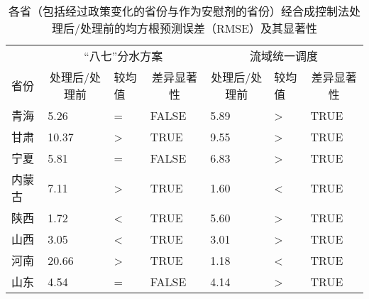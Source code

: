 
\begin{table}[!htbp]\footnotesize
	\centering
	\caption[合成控制法的安慰剂检验结果]{各省（包括经过政策变化的省份与作为安慰剂的省份）经合成控制法处理后/处理前的均方根预测误差（RMSE）及其显著性}
	\begin{tabularx}{\textwidth}{XXXXXXX}
	  \toprule
			& \multicolumn{3}{c}{“八七”分水方案} & \multicolumn{3}{c}{流域统一调度} \\
  \cmidrule{2-7}    省份  & \multicolumn{1}{c}{处理后/处理前} & 较均值 & \multicolumn{1}{c}{差异显著性} & \multicolumn{1}{c}{处理后/处理前} & 较均值   & \multicolumn{1}{c}{差异显著性} \\
	  \midrule
	  青海 & 5.26  & =     & FALSE & 5.89  & >     & TRUE \\
	  甘肃 & 10.37  & >     & TRUE  & 9.55  & >     & TRUE \\
	  宁夏 & 5.81  & =     & FALSE & 6.83  & >     & TRUE \\
	  内蒙古 & 7.11  & >     & TRUE  & 1.60  & <     & TRUE \\
	  陕西 & 1.72  & <     & TRUE  & 5.60  & >     & TRUE \\
	  山西 & 3.05  & <     & TRUE  & 3.01  & >     & TRUE \\
	  河南 & 20.66  & >     & TRUE  & 1.18  & <     & TRUE \\
	  山东 & 4.54  & =     & FALSE & 4.14  & >     & TRUE \\
	  \bottomrule
	  \end{tabularx}%
	\label{ch5:tab:RMSE}%
\end{table}%
